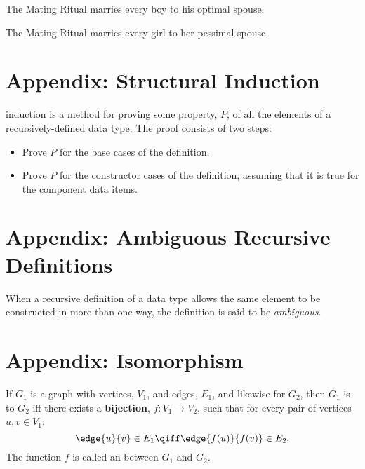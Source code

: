 \documentclass[quiz]{mcs}
\begin{document}
The Mating Ritual marries every boy to his optimal spouse.

The Mating Ritual marries every girl to her pessimal spouse.

\section*{Appendix: Structural Induction}

 induction is a method for proving
some property, $P$, of all the elements of a recursively-defined data
type.  The proof consists of two steps:
\begin{itemize}
\item Prove $P$ for the base cases of the definition. 
\item Prove $P$ for the constructor cases of the definition, assuming that it
  is true for the component data items.  
\end{itemize}

\section*{Appendix: Ambiguous Recursive Definitions}

When a recursive definition of a data type
allows the same element to be constructed in more than one way, the
definition is said to be \emph{ambiguous}.

\section*{Appendix: Isomorphism}

  If $G_1$ is a graph with vertices, $V_1$, and edges, $E_1$, and likewise
  for $G_2$, then $G_1$ is  to $G_2$ iff there exists a
  \textbf{bijection}, $f: V_1 \to V_2$, such that for every pair of
  vertices $u, v \in V_1$:
\[
\edge{u}{v} \in E_1 \qiff \edge{f(u)}{f(v)} \in E_2.
\]
The function $f$ is called an  between $G_1$ and
$G_2$.
\end{document}
